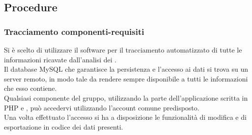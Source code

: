 \documentclass[NormeDiProgetto.tex]{subfiles}
\begin{document}






\subsection{Procedure}

\subsubsection{Tracciamento componenti-requisiti}
	Si è scelto di utilizzare il software  per il tracciamento automatizzato di tutte le informazioni ricavate dall'analisi dei .\\
	Il database MySQL che garantisce la persistenza e l'accesso ai dati si trova su un server remoto, in modo tale da rendere sempre disponibile a tutti le informazioni che esso contiene.\\
	Qualsiasi componente del gruppo, utilizzando la parte  dell'applicazione scritta in PHP e , può accedervi utilizzando l'account comune predisposto.\\
	Una volta effettuato l'accesso si ha a disposizione le funzionalità di modifica e di esportazione in codice  dei dati presenti.\\
\end{document}

